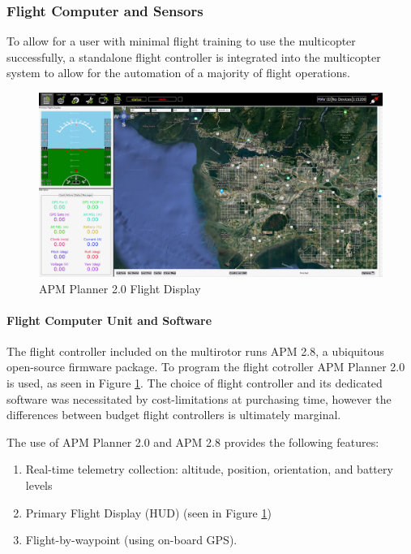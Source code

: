 \subsubsection{Flight Computer and Sensors}
To allow for a user with minimal flight training to use the multicopter successfully, a standalone flight controller is integrated into the multicopter system to allow for the automation of a majority of flight operations. 

\begin{figure}[H]
	\centering
	\includegraphics[width=15cm]{img/HUD.png}
	\caption{APM Planner 2.0 Flight Display}
	\label{flightdisplay}
	\end{figure}


\paragraph{Flight Computer Unit and Software}
The flight controller included on the multirotor runs APM 2.8, a ubiquitous open-source firmware package. To program the flight cotroller APM Planner 2.0 is used, as seen in Figure \ref{flightdisplay}. The choice of flight controller and its dedicated software was necessitated by cost-limitations at purchasing time, however the differences between budget flight controllers is ultimately marginal.


The use of APM Planner 2.0 and APM 2.8 provides the following features:

\begin{enumerate}

    \item Real-time telemetry collection: altitude, position, orientation, and battery levels
     
    \item Primary Flight Display (HUD) (seen in Figure \ref{flightdisplay})
    
    \item Flight-by-waypoint (using on-board GPS).
\end{enumerate}

